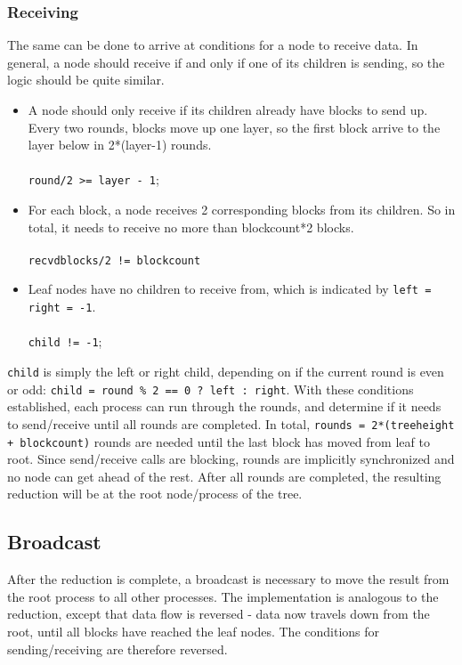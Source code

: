 \documentclass[twoside,twocolumn,hidelinks]{article}
\begin{document}
\subsubsection{Receiving}
The same can be done to arrive at conditions for a node to receive data. In general, a node should receive if and only if one of its children is sending, so the logic should be quite similar.

\begin{itemize}
      \item A node should only receive if its children already have blocks to send up. Every two rounds, blocks move up one layer, so the first block arrive to the layer below in 2*(layer-1) rounds. \\\\
      \texttt{round/2 >= layer - 1};
      \item For each block, a node receives 2 corresponding blocks from its children. So in total, it needs to receive no more than blockcount*2 blocks. \\\\
      \texttt{recvdblocks/2 != blockcount}
      \item Leaf nodes have no children to receive from, which is indicated by \texttt{left = right = -1}. \\\\
      \texttt{child != -1};
\end{itemize}

\texttt{child} is simply the left or right child, depending on if the current round is even or odd: \texttt{child = round \% 2 == 0 ? left : right}. With these conditions established, each process can run through the rounds, and determine if it needs to send/receive until all rounds are completed. In total, \texttt{rounds = 2*(treeheight + blockcount)} rounds are needed until the last block has moved from leaf to root. Since send/receive calls are blocking, rounds are implicitly synchronized and no node can get ahead of the rest. After all rounds are completed, the resulting reduction will be at the root node/process of the tree.

\subsection{Broadcast}
After the reduction is complete, a broadcast is necessary to move the result from the root process to all other processes. The implementation is analogous to the reduction, except that data flow is reversed - data now travels down from the root, until all blocks have reached the leaf nodes. The conditions for sending/receiving are therefore reversed.
\end{document}
